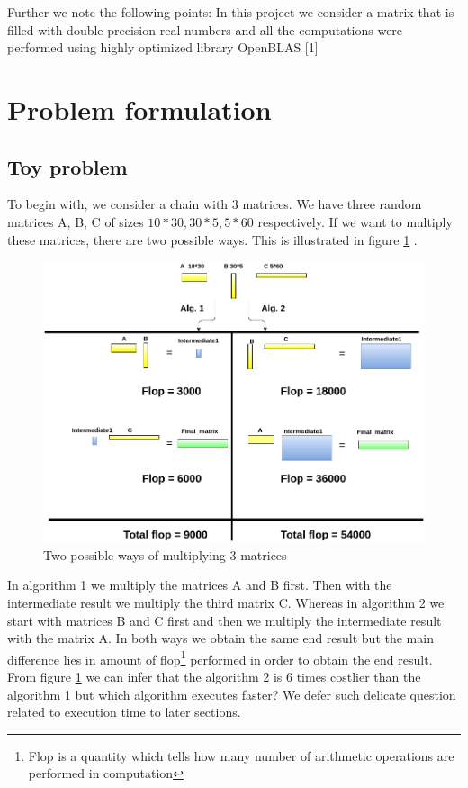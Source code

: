 \documentclass[10pts]{article}
\begin{document}
Further we note the following points: In this project we consider a matrix that is filled with double precision real numbers and all the computations were performed using highly optimized library OpenBLAS [1]


\section{Problem formulation}

\subsection*{Toy problem} 
 To begin with, we consider a chain with 3 matrices. We have three random matrices A, B, C of sizes $10*30, 30*5, 5*60$ respectively. If we want to multiply these matrices, there are two possible ways.
 This is illustrated in figure \ref{fig:3mat_1_full} .  
 
 
 \begin{figure}[h!]	
 	\begin{center}
 	\includegraphics[scale =0.4]{3mat_1_full.png}
 	\caption{Two possible ways of multiplying 3 matrices}
 	\label{fig:3mat_1_full}
    \end{center}
  \end{figure}
In algorithm 1 we multiply the matrices A and B first. Then with the intermediate result we multiply the third matrix C. Whereas in algorithm 2 we start with matrices B and C first and then we multiply the intermediate result with the matrix A. In both ways we obtain the same end result but the main difference lies in amount of flop\footnote{Flop is a quantity which tells how many number of arithmetic operations are performed in computation} performed in order to obtain the end result. From figure \ref{fig:3mat_1_full} we can infer that the algorithm 2 is 6 times costlier than the algorithm 1 but which algorithm executes faster? We defer such delicate question related to execution time to later sections.     
\end{document}
